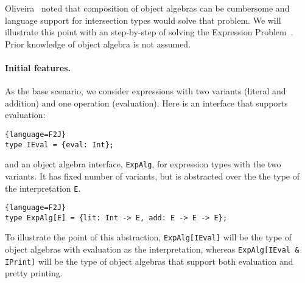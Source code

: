



Oliveira~\cite{} noted that composition of object algebras can be cumbersome and
language support for intersection types would solve that problem. 
We will illustrate this point with an step-by-step of solving the Expression
Problem~\cite{wadler1998expression}. Prior knowledge of object algebra is not
assumed.

\paragraph{Initial features.}
As the base scenario, we consider expressions with two variants (literal and
addition) and one operation (evaluation). Here is an interface that supports
evaluation:
\begin{lstlisting}{language=F2J}
type IEval = {eval: Int};
\end{lstlisting}
and an object algebra interface, \lstinline$ExpAlg$, for expression types with
the two variants. It has fixed number of variants, but is abstracted over the
the type of the interpretation \lstinline$E$.
\begin{lstlisting}{language=F2J}
type ExpAlg[E] = {lit: Int -> E, add: E -> E -> E};
\end{lstlisting}
To illustrate the point of this abstraction, \lstinline$ExpAlg[IEval]$ will be
the type of object algebras with evaluation as the interpretation, whereas
\lstinline$ExpAlg[IEval & IPrint]$ will be the type of object algebras that
support both evaluation and pretty printing.

